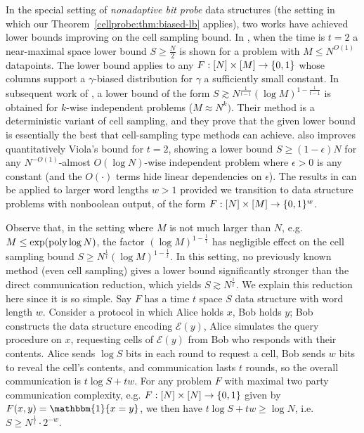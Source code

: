 In the special setting of \emph{nonadaptive bit probe} data structures (the setting in which our Theorem~\ref{cellprobe:thm:biased-lb} applies), two works have achieved lower bounds improving on the cell sampling bound. In \cite{viola-maximal}, when the time is $t=2$ a near-maximal space lower bound $S \geq \frac{N}{2}$ is shown for a problem with $M \leq N^{O(1)}$ datapoints. The lower bound applies to any $F: [N] \times [M] \to \{0,1\}$ whose columns support a $\gamma$-biased distribution for $\gamma$ a sufficiently small constant. 
In subsequent work of \cite{golovnev}, a lower bound of the form $S \gtrsim N^{\frac{1}{t-1}} (\log M)^{1-\frac{1}{t-1}}$ is obtained for $k$-wise independent problems ($M \approx N^k)$. Their method is a deterministic variant of cell sampling, and they prove that the given lower bound is essentially the best that cell-sampling type methods can achieve. \cite{golovnev} also improves quantitatively Viola's bound for $t=2$, showing a lower bound $S \geq (1-\epsilon)N$ for any $N^{-O(1)}$-almost $O(\log N)$-wise independent problem where $\epsilon > 0$ is any constant (and the $O(\cdot)$ terms hide linear dependencies on $\epsilon$).
The results in \cite{golovnev} can be applied to larger word lengths $w>1$ provided we transition to data structure problems with nonboolean output, of the form $F:[N] \times [M] \to \{0,1\}^w$. 

Observe that, in the setting where $M$ is not much larger than $N$, e.g. $M \leq \exp(\mathrm{poly}\log N)$, the factor $(\log M)^{1 - \frac{1}{t}}$ has negligible effect on the cell sampling bound $S \geq N^{\frac{1}{t}} (\log M)^{1 - \frac{1}{t}}$. In this setting, no previously known method (even cell sampling) gives a lower bound significantly stronger than the direct communication reduction, which yields $S \gtrsim N^{\frac{1}{t}}$. We explain this reduction here since it is so simple. Say $F$ has a time $t$ space $S$ data structure with word length $w$. Consider a protocol in which Alice holds $x$, Bob holds $y$; Bob constructs the data structure encoding $\mathcal{E}(y)$, Alice simulates the query procedure on $x$, requesting cells of $\mathcal{E}(y)$ from Bob who responds with their contents. Alice sends $\log S$ bits in each round to request a cell, Bob sends $w$ bits to reveal the cell's contents, and communication lasts $t$ rounds, so the overall communication is $t \log S + tw$. For any problem $F$ with maximal two party communication complexity, e.g. $F:[N] \times [N] \to \{0,1\}$ given by $F(x,y) = \mathbbm{1}\{x=y\}$, we then have $t\log S + tw \geq \log N$, i.e. $S\geq  N^{\frac{1}{t}} \cdot 2^{-w}$.

